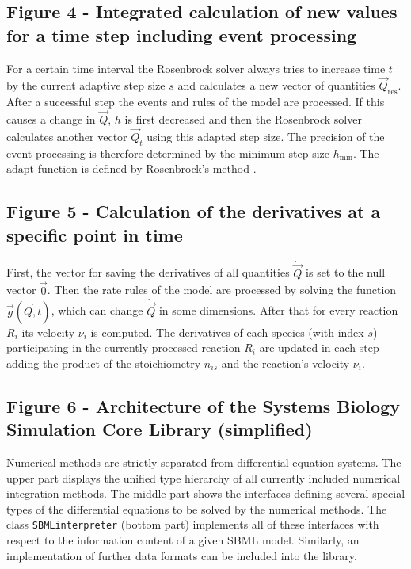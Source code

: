 \documentclass[10pt]{bmc_article}
\newenvironment{bmcformat}{\baselineskip20pt\sloppy\setboolean{publ}{false}}{\baselineskip20pt\sloppy}
\newcommand{\SBMLinterpreter}{\texttt{SBML\-interpreter}}
\begin{document}
\begin{bmcformat}
\subsection*{Figure 4 - Integrated calculation of new values for a time step including event processing}
For a certain time interval the Rosenbrock solver always tries to increase time $t$ by the current adaptive
step size $s$ and calculates a new vector of quantities $\vec{Q}_{\mathrm{res}}$.
After a successful step the events and rules of the model are processed.
If this causes a change in $\vec{Q}$, $h$ is first decreased and then the Rosenbrock solver calculates another vector $\vec{Q}_{t}$ using this adapted step size.
The precision of the event processing is therefore determined by the minimum step size $h_{\min}$.
The $\mathrm{adapt}$ function is defined by Rosenbrock's method \cite{Press1993}.

\subsection*{Figure 5 - Calculation of the derivatives at a specific point in time}
First, the vector for saving the derivatives of all quantities $\dot{\vec{Q}}$ is set to the null vector $\vec{0}$.
Then the rate rules of the model are processed by solving the function $\vec{g}(\vec{Q}, t)$, which can change $\dot{\vec{Q}}$ in some dimensions.
After that for every reaction $R_i$ its velocity $\nu_i$ is computed.
The derivatives of each species (with index $s$) participating in the currently processed reaction $R_i$ are updated
in each step adding the product of the stoichiometry $n_{is}$ and the reaction's velocity $\nu_i$.

\subsection*{Figure 6 - Architecture of the Systems Biology Simulation Core Library (simplified)}
Numerical methods are strictly separated from differential equation systems. The
upper part displays the unified type hierarchy of all currently included numerical integration
methods. The middle part shows the interfaces defining several
special types of the differential equations to be solved by the numerical
methods.
The class \SBMLinterpreter{} (bottom part) implements all of these interfaces
with respect to the information content of a given SBML model. Similarly, an
implementation of further data formats can be included into the
library.


\end{bmcformat}
\end{document}

